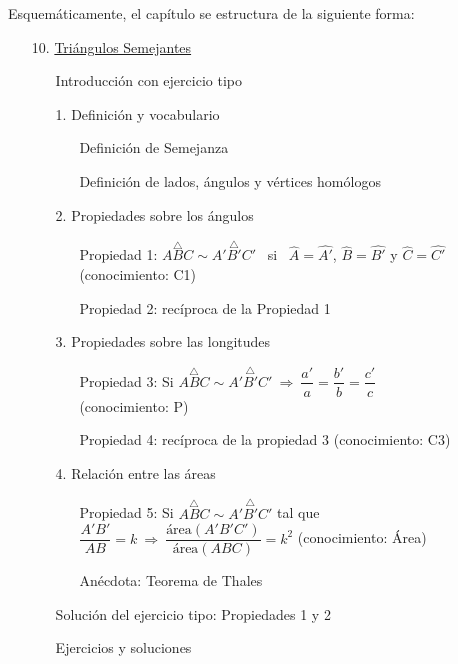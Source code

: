 	Esquemáticamente, el capítulo se estructura de la siguiente forma:
	\begin{itemize}
		\item[10.] \underline{Triángulos Semejantes}
		\begin{itemize}
			\item[\ding{43}] Introducción con ejercicio tipo
			\item[1.] Definición y vocabulario
			\begin{itemize}
				\item[\textbullet] Definición de Semejanza
				\item[\textbullet] Definición de lados, ángulos y vértices homólogos
			\end{itemize}
			\item[2.] Propiedades sobre los ángulos
			\begin{itemize}
				\item[\textbullet] Propiedad 1: $\overset{\triangle}{ABC}\sim\overset{\triangle}{A'B'C'}$ \ si \ $\hat{A}=\hat{A'}$, $\hat{B}=\hat{B'}$ y $\hat{C}=\hat{C'}$ \\ (conocimiento: C1)
				\item[\textbullet] Propiedad 2: recíproca de la Propiedad 1 
			\end{itemize}
			\item[3.] Propiedades sobre las longitudes
			\begin{itemize}
				\item[\textbullet] Propiedad 3: Si $\overset{\triangle}{ABC}\sim\overset{\triangle}{A'B'C'} \ \Longrightarrow \ \dfrac{a'}{a}=\dfrac{b'}{b}=\dfrac{c'}{c}$ \\(conocimiento: P)
				\item[\textbullet] Propiedad 4: recíproca de la propiedad 3 (conocimiento: C3)
			\end{itemize}
			\item[4.] Relación entre las áreas
			\begin{itemize}
				\item[\textbullet] Propiedad 5: Si $\overset{\triangle}{ABC}\sim\overset{\triangle}{A'B'C'}$ tal que $\dfrac{A'B'}{AB}=k \ \Longrightarrow \ \dfrac{\text{área}(A'B'C')}{\text{área}(ABC)}=k^2$ (conocimiento: Área)
				\item[\textbullet] Anécdota: Teorema de Thales
			\end{itemize}
			\item[\ding{43}] Solución del ejercicio tipo: Propiedades 1 y 2
			\item[\ding{43}] Ejercicios y soluciones
		\end{itemize}
	\end{itemize}
	
